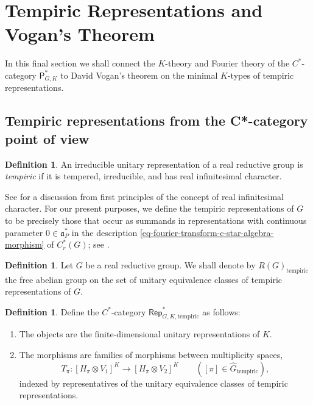 \documentclass[leqno,11pt]{amsart}
\numberwithin{equation}{subsection}
\theoremstyle{plain}
\theoremstyle{definition}
\newtheorem{definition}[equation]{Definition}
\theoremstyle{remark}
\newcommand{\tempiric}{\mathrm{tempiric}}
\newcommand{\PSDO}{\mathsf{P}}
\newcommand{\Rep}{\mathsf{Rep}}
\begin{document}
\section{Tempiric Representations and Vogan's Theorem}
\label{sec-vogan-and-tempiric-reps} 

In this final section we shall connect the  $K$-theory and   Fourier theory of the $C^*$-category $\PSDO^*_{G,K}$  to  David Vogan's theorem on   the minimal $K$-types of tempiric representations.

\subsection{Tempiric representations from the C*-category point of view} 

\begin{definition}
    An irreducible  unitary representation of a real reductive group is \emph{tempiric} if it is tempered, irreducible,  and has real infinitesimal character.  
\end{definition}

See \cite[Sec.\ 2]{Vogan00} for a discussion from first principles of the concept of real infinitesimal character. For our present purposes, we define the tempiric representations of $G$ to be   precisely those that occur as summands in representations with continuous parameter $0\in \mathfrak{a}^*_P$ in the description \eqref{eq-fourier-transform-c-star-algebra-morphism} of $C^*_r(G)$; see \cite[Cor.\ 3.5]{Vogan00}.

\begin{definition} 
Let $G$ be a real reductive group.  
We shall denote by  $R(G)_{\tempiric}$ the free abelian group on the set of unitary equivalence classes of tempiric representations of $G$.
\end{definition}

\begin{definition} 
\label{def-rep-tempiric-category}
Define the $C^*$-category $\Rep^*_{G,K,\tempiric }$ as follows: 
\begin{enumerate}[\rm (i)]

\item The objects are the finite-dimensional unitary representations of $K$.

\item The morphisms are  families of morphisms between multiplicity spaces, 
\[
 T_\pi  \colon [H_\pi \otimes V_1 ]^K \longrightarrow [H_\pi \otimes V_2 ]^K \qquad ([\pi]\in \widehat G _{\tempiric}),
\]
indexed by representatives of the unitary  equivalence classes of tempiric representations.
\end{enumerate}
\end{definition}
\end{document}
